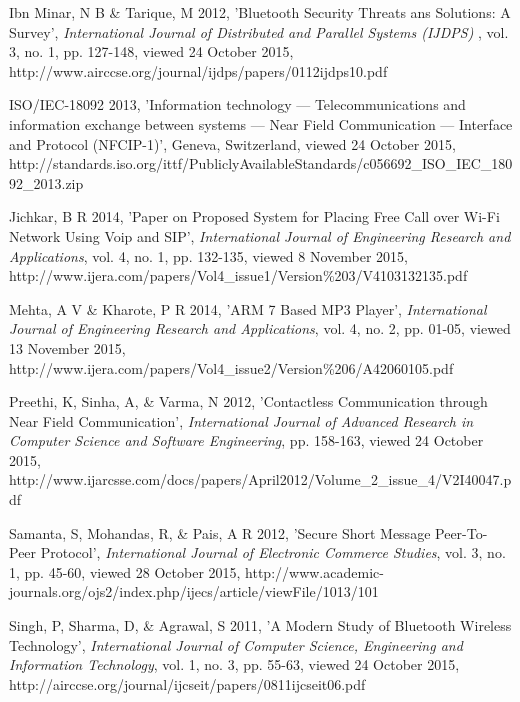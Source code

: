 \documentclass[12pt,svgnames,smaller]{article} %
\begin{document}
\begin{thebibliography}{ 10 }
		
		Ibn Minar, N B \& Tarique, M 2012, 'Bluetooth Security Threats ans Solutions: A Survey', \emph{International Journal of Distributed and Parallel Systems (IJDPS)} , vol. 3, no. 1, pp. 127-148, viewed 24 October 2015, http://www.airccse.org/journal/ijdps/papers/0112ijdps10.pdf
		
		
		ISO/IEC-18092 2013, 'Information technology — Telecommunications and information exchange between systems — Near Field Communication — Interface and Protocol (NFCIP-1)', Geneva, Switzerland, viewed 24 October 2015, http://standards.iso.org/ittf/PubliclyAvailableStandards/c056692\_ISO\_IEC\_18092\_2013.zip
		
		
		Jichkar, B R 2014, 'Paper on Proposed System for Placing Free Call over Wi-Fi Network Using Voip and SIP', \emph{International Journal of Engineering Research and Applications}, vol. 4, no. 1, pp. 132-135, viewed 8 November 2015, http://www.ijera.com/papers/Vol4\_issue1/Version\%203/V4103132135.pdf 
		
		
		Mehta, A V \& Kharote, P R 2014, 'ARM 7 Based MP3 Player', \emph{International Journal of Engineering Research and Applications}, vol. 4, no. 2, pp. 01-05, viewed 13 November 2015, http://www.ijera.com/papers/Vol4\_issue2/Version\%206/A42060105.pdf 
		
		
		Preethi, K, Sinha, A, \& Varma, N 2012, 'Contactless Communication through Near Field Communication', \emph{International Journal of Advanced Research in Computer Science and Software Engineering}, pp. 158-163, viewed 24 October 2015, http://www.ijarcsse.com/docs/papers/April2012/Volume\_2\_issue\_4/V2I40047.pdf
		
		
		Samanta, S, Mohandas, R, \& Pais, A R 2012, 'Secure Short Message Peer-To-Peer Protocol', \emph{International Journal of Electronic Commerce Studies}, vol. 3, no. 1, pp. 45-60, viewed 28 October 2015, http://www.academic-journals.org/ojs2/index.php/ijecs/article/viewFile/1013/101
		
		
		Singh, P, Sharma, D, \& Agrawal, S 2011, 'A Modern Study of Bluetooth Wireless Technology', \emph{International Journal of Computer Science, Engineering and Information Technology}, vol. 1, no. 3, pp. 55-63, viewed 24 October 2015, http://airccse.org/journal/ijcseit/papers/0811ijcseit06.pdf
		

\end{thebibliography}
\end{document}

